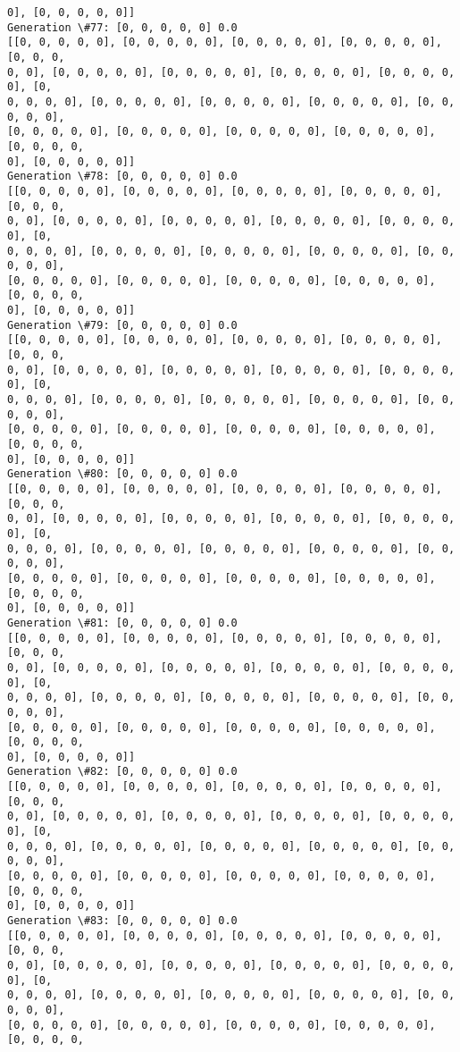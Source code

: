 \documentclass[11pt]{article}
\begin{document}
\begin{Verbatim}[commandchars=\\\{\}]
0], [0, 0, 0, 0, 0]]
Generation \#77: [0, 0, 0, 0, 0] 0.0
[[0, 0, 0, 0, 0], [0, 0, 0, 0, 0], [0, 0, 0, 0, 0], [0, 0, 0, 0, 0], [0, 0, 0,
0, 0], [0, 0, 0, 0, 0], [0, 0, 0, 0, 0], [0, 0, 0, 0, 0], [0, 0, 0, 0, 0], [0,
0, 0, 0, 0], [0, 0, 0, 0, 0], [0, 0, 0, 0, 0], [0, 0, 0, 0, 0], [0, 0, 0, 0, 0],
[0, 0, 0, 0, 0], [0, 0, 0, 0, 0], [0, 0, 0, 0, 0], [0, 0, 0, 0, 0], [0, 0, 0, 0,
0], [0, 0, 0, 0, 0]]
Generation \#78: [0, 0, 0, 0, 0] 0.0
[[0, 0, 0, 0, 0], [0, 0, 0, 0, 0], [0, 0, 0, 0, 0], [0, 0, 0, 0, 0], [0, 0, 0,
0, 0], [0, 0, 0, 0, 0], [0, 0, 0, 0, 0], [0, 0, 0, 0, 0], [0, 0, 0, 0, 0], [0,
0, 0, 0, 0], [0, 0, 0, 0, 0], [0, 0, 0, 0, 0], [0, 0, 0, 0, 0], [0, 0, 0, 0, 0],
[0, 0, 0, 0, 0], [0, 0, 0, 0, 0], [0, 0, 0, 0, 0], [0, 0, 0, 0, 0], [0, 0, 0, 0,
0], [0, 0, 0, 0, 0]]
Generation \#79: [0, 0, 0, 0, 0] 0.0
[[0, 0, 0, 0, 0], [0, 0, 0, 0, 0], [0, 0, 0, 0, 0], [0, 0, 0, 0, 0], [0, 0, 0,
0, 0], [0, 0, 0, 0, 0], [0, 0, 0, 0, 0], [0, 0, 0, 0, 0], [0, 0, 0, 0, 0], [0,
0, 0, 0, 0], [0, 0, 0, 0, 0], [0, 0, 0, 0, 0], [0, 0, 0, 0, 0], [0, 0, 0, 0, 0],
[0, 0, 0, 0, 0], [0, 0, 0, 0, 0], [0, 0, 0, 0, 0], [0, 0, 0, 0, 0], [0, 0, 0, 0,
0], [0, 0, 0, 0, 0]]
Generation \#80: [0, 0, 0, 0, 0] 0.0
[[0, 0, 0, 0, 0], [0, 0, 0, 0, 0], [0, 0, 0, 0, 0], [0, 0, 0, 0, 0], [0, 0, 0,
0, 0], [0, 0, 0, 0, 0], [0, 0, 0, 0, 0], [0, 0, 0, 0, 0], [0, 0, 0, 0, 0], [0,
0, 0, 0, 0], [0, 0, 0, 0, 0], [0, 0, 0, 0, 0], [0, 0, 0, 0, 0], [0, 0, 0, 0, 0],
[0, 0, 0, 0, 0], [0, 0, 0, 0, 0], [0, 0, 0, 0, 0], [0, 0, 0, 0, 0], [0, 0, 0, 0,
0], [0, 0, 0, 0, 0]]
Generation \#81: [0, 0, 0, 0, 0] 0.0
[[0, 0, 0, 0, 0], [0, 0, 0, 0, 0], [0, 0, 0, 0, 0], [0, 0, 0, 0, 0], [0, 0, 0,
0, 0], [0, 0, 0, 0, 0], [0, 0, 0, 0, 0], [0, 0, 0, 0, 0], [0, 0, 0, 0, 0], [0,
0, 0, 0, 0], [0, 0, 0, 0, 0], [0, 0, 0, 0, 0], [0, 0, 0, 0, 0], [0, 0, 0, 0, 0],
[0, 0, 0, 0, 0], [0, 0, 0, 0, 0], [0, 0, 0, 0, 0], [0, 0, 0, 0, 0], [0, 0, 0, 0,
0], [0, 0, 0, 0, 0]]
Generation \#82: [0, 0, 0, 0, 0] 0.0
[[0, 0, 0, 0, 0], [0, 0, 0, 0, 0], [0, 0, 0, 0, 0], [0, 0, 0, 0, 0], [0, 0, 0,
0, 0], [0, 0, 0, 0, 0], [0, 0, 0, 0, 0], [0, 0, 0, 0, 0], [0, 0, 0, 0, 0], [0,
0, 0, 0, 0], [0, 0, 0, 0, 0], [0, 0, 0, 0, 0], [0, 0, 0, 0, 0], [0, 0, 0, 0, 0],
[0, 0, 0, 0, 0], [0, 0, 0, 0, 0], [0, 0, 0, 0, 0], [0, 0, 0, 0, 0], [0, 0, 0, 0,
0], [0, 0, 0, 0, 0]]
Generation \#83: [0, 0, 0, 0, 0] 0.0
[[0, 0, 0, 0, 0], [0, 0, 0, 0, 0], [0, 0, 0, 0, 0], [0, 0, 0, 0, 0], [0, 0, 0,
0, 0], [0, 0, 0, 0, 0], [0, 0, 0, 0, 0], [0, 0, 0, 0, 0], [0, 0, 0, 0, 0], [0,
0, 0, 0, 0], [0, 0, 0, 0, 0], [0, 0, 0, 0, 0], [0, 0, 0, 0, 0], [0, 0, 0, 0, 0],
[0, 0, 0, 0, 0], [0, 0, 0, 0, 0], [0, 0, 0, 0, 0], [0, 0, 0, 0, 0], [0, 0, 0, 0,

\end{Verbatim}
\end{document}
